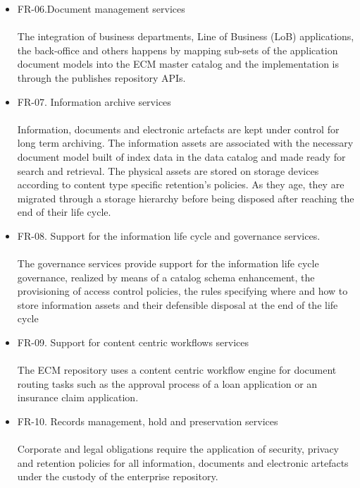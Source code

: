 \documentclass[EPiC]{easychair} %
\begin{document}
\begin{itemize}
    \item FR-06.Document management services \paragraph{} The integration of business departments, Line of Business (LoB) applications, the back-office and others happens by mapping sub-sets of the application document models into the ECM master catalog and the implementation is through the publishes repository APIs. 
    \item FR-07. Information archive services \paragraph{} Information, documents and electronic artefacts are kept under control for long term archiving. The information assets are associated with the necessary document model built of index data in the data catalog and made ready for search and retrieval. The physical assets are stored on storage devices according to content type specific retention's policies. As they age, they are migrated through a storage hierarchy before being disposed after reaching the end of their life cycle.  
    \item FR-08. Support for the information life cycle and governance services. \paragraph{} The governance services provide support for the information life cycle governance, realized by means of a catalog schema enhancement, the provisioning of access control policies, the rules specifying where and how to store information assets and their defensible disposal at the end of the life cycle
    \item FR-09. Support for content centric workflows services \paragraph{} The ECM repository uses a content centric workflow engine for document routing tasks such as the approval process of a loan application or an insurance claim application.
    \item FR-10. Records management, hold and preservation services \paragraph{} Corporate and legal obligations require the application of security, privacy and retention policies for all information, documents and electronic artefacts under the custody of the enterprise repository. 

\end{itemize}
\end{document}
